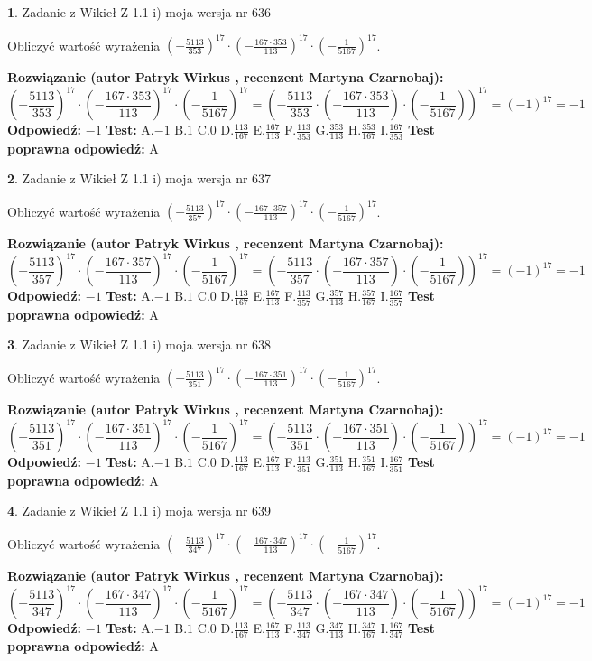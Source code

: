 \documentclass[12pt, a4paper]{article}
\theoremstyle{definition} %
\newtheorem{zad}{}
\newcommand{\zadStart}[1]{\begin{zad}#1\newline}
\newcommand{\zadStop}{\end{zad}}
\newcommand{\rozwStart}[2]{\noindent \textbf{Rozwiązanie (autor #1 , recenzent #2): }\newline}
\newcommand{\rozwStop}{\newline}
\newcommand{\odpStart}{\noindent \textbf{Odpowiedź:}\newline}
\newcommand{\odpStop}{\newline}
\newcommand{\testStart}{\noindent \textbf{Test:}\newline}
\newcommand{\testStop}{\newline}
\newcommand{\kluczStart}{\noindent \textbf{Test poprawna odpowiedź:}\newline}
\newcommand{\kluczStop}{\newline}
\begin{document}
\zadStart{Zadanie z Wikieł Z 1.1 i) moja wersja nr 636}

Obliczyć wartość wyrażenia $(-\frac{5113}{353})^{17} \cdot (-\frac{167 \cdot 353}{113})^{17} \cdot (-\frac{1}{5167})^{17}$.
\zadStop
\rozwStart{Patryk Wirkus}{Martyna Czarnobaj}
$$(-\frac{5113}{353})^{17} \cdot (-\frac{167 \cdot 353}{113})^{17} \cdot (-\frac{1}{5167})^{17} = (-\frac{5113}{353} \cdot (-\frac{167 \cdot 353}{113}) \cdot (-\frac{1}{5167}))^{17} = (-1)^{17} = -1$$
\rozwStop
\odpStart
$-1$
\odpStop
\testStart
A.$-1$ B.$1$ C.$0$ D.$\frac{113}{167}$ E.$\frac{167}{113}$
F.$\frac{113}{353}$ G.$\frac{353}{113}$
H.$\frac{353}{167}$
I.$\frac{167}{353}$
\testStop
\kluczStart
A
\kluczStop



\zadStart{Zadanie z Wikieł Z 1.1 i) moja wersja nr 637}

Obliczyć wartość wyrażenia $(-\frac{5113}{357})^{17} \cdot (-\frac{167 \cdot 357}{113})^{17} \cdot (-\frac{1}{5167})^{17}$.
\zadStop
\rozwStart{Patryk Wirkus}{Martyna Czarnobaj}
$$(-\frac{5113}{357})^{17} \cdot (-\frac{167 \cdot 357}{113})^{17} \cdot (-\frac{1}{5167})^{17} = (-\frac{5113}{357} \cdot (-\frac{167 \cdot 357}{113}) \cdot (-\frac{1}{5167}))^{17} = (-1)^{17} = -1$$
\rozwStop
\odpStart
$-1$
\odpStop
\testStart
A.$-1$ B.$1$ C.$0$ D.$\frac{113}{167}$ E.$\frac{167}{113}$
F.$\frac{113}{357}$ G.$\frac{357}{113}$
H.$\frac{357}{167}$
I.$\frac{167}{357}$
\testStop
\kluczStart
A
\kluczStop



\zadStart{Zadanie z Wikieł Z 1.1 i) moja wersja nr 638}

Obliczyć wartość wyrażenia $(-\frac{5113}{351})^{17} \cdot (-\frac{167 \cdot 351}{113})^{17} \cdot (-\frac{1}{5167})^{17}$.
\zadStop
\rozwStart{Patryk Wirkus}{Martyna Czarnobaj}
$$(-\frac{5113}{351})^{17} \cdot (-\frac{167 \cdot 351}{113})^{17} \cdot (-\frac{1}{5167})^{17} = (-\frac{5113}{351} \cdot (-\frac{167 \cdot 351}{113}) \cdot (-\frac{1}{5167}))^{17} = (-1)^{17} = -1$$
\rozwStop
\odpStart
$-1$
\odpStop
\testStart
A.$-1$ B.$1$ C.$0$ D.$\frac{113}{167}$ E.$\frac{167}{113}$
F.$\frac{113}{351}$ G.$\frac{351}{113}$
H.$\frac{351}{167}$
I.$\frac{167}{351}$
\testStop
\kluczStart
A
\kluczStop



\zadStart{Zadanie z Wikieł Z 1.1 i) moja wersja nr 639}

Obliczyć wartość wyrażenia $(-\frac{5113}{347})^{17} \cdot (-\frac{167 \cdot 347}{113})^{17} \cdot (-\frac{1}{5167})^{17}$.
\zadStop
\rozwStart{Patryk Wirkus}{Martyna Czarnobaj}
$$(-\frac{5113}{347})^{17} \cdot (-\frac{167 \cdot 347}{113})^{17} \cdot (-\frac{1}{5167})^{17} = (-\frac{5113}{347} \cdot (-\frac{167 \cdot 347}{113}) \cdot (-\frac{1}{5167}))^{17} = (-1)^{17} = -1$$
\rozwStop
\odpStart
$-1$
\odpStop
\testStart
A.$-1$ B.$1$ C.$0$ D.$\frac{113}{167}$ E.$\frac{167}{113}$
F.$\frac{113}{347}$ G.$\frac{347}{113}$
H.$\frac{347}{167}$
I.$\frac{167}{347}$
\testStop
\kluczStart
A
\kluczStop
\end{document}
